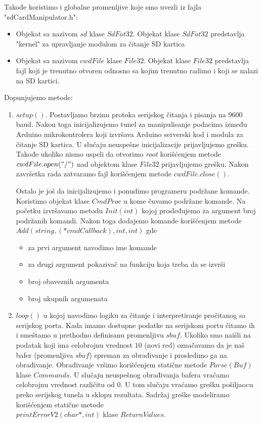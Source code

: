 \documentclass[a4paper]{extarticle}
\begin{document}
Takođe koristimo i globalne promenljive koje smo uvezli iz fajla "sdCardManipulator.h":
	\begin{itemize}
		\item Objekat sa nazivom $sd$ klase $SdFat32$. Objekat klase $SdFat32$ predstavlja "kernel" za upravljanje modulom za čitanje SD kartica
		\item Objekat sa nazivom $cwdFile$ klase $File32$. Objekat klase $File32$ predstavlja fajl koji je trenutno otvoren odnosno sa kojim trenutno radimo i koji se nalazi na SD kartici.
	\end{itemize}

Dopunjujemo metode:
\begin{enumerate}
		\item  $setup()$. 
		Postavljamo brzinu protoka serijskog  čitanja i pisanja na 9600 baud. Nakon toga inicijalizujemo tunel za manipulisanje podacima između Arduino mikrokontrolera koji izvršava Arduino serverski kod i modula za čitanje SD kartica. U slučaju neuspešne inicijalizacije prijavljujemo grešku. Takođe ukoliko nismo uspeli da otvorimo \textit{root} korišćenjem metode $cwdFile.open("/")$ nad objektom klase $File32$  prijavljujemo grešku.
		Nakon završetka rada zatvaramo fajl korišćenjem metode $cwdFile.close()$.
		
		Ostalo je još da inicijalizujemo i ponudimo programeru podržane komande. Koristimo objekat klase $CmdProc$ u kome čuvamo podržane komande. Na početku izvršavamo metodu $Init(int)$ kojoj prosleđujemo za argument broj podržanih komandi. Nakon toga dodajemo komande korišćenjem metode \\$Add(string, (*cmdCallback), int, int )$ gde
		\begin{itemize}
			\item za prvi argument navodimo ime komande
			\item za drugi argument pokazivač na funkciju koja treba da se izvrši
			\item broj obaveznih argumenta
			\item broj ukupnih argumenata
		\end{itemize} 
	
		\item $loop()$ u kojoj navodimo logiku za čitanje i interpretiranje pročitanog sa serijskog porta. Kada imamo dostupne podatke na serijskom portu čitamo ih i smeštamo u prethodno definisanu promenljivu $sbuf$. Ukoliko smo naišli na podatak koji ima celobrojnu vrednost $10$ (novi red) označavamo da je naš bafer (promenljiva $sbuf$) spreman za obrađivanje i prosledimo ga na obrađivanje. Obrađivanje vršimo korišćenjem statične metode $Parse(Buf)$ klase $Commands$. U slučaju neuspešnog obrađivanja bafera vraćamo celobrojnu vrednost različitu od $0$.
		U tom slučaju vraćamo grešku pošiljaocu preko serijskog tunela u sklopu rezultata. Sadržaj greške modeliramo korišćenjem statične metode\\ $printErrorV2(char*, int)$ klase  $ReturnValues$.
		

\end{enumerate}
\end{document}
